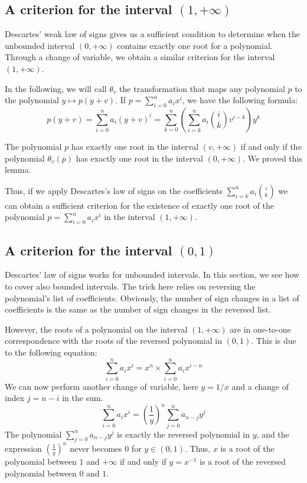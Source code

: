 \documentclass{mscs}
\begin{document}
\subsection{A criterion for the interval \((1,+\infty)\)}
Descartes' weak law of signs gives us a sufficient condition to
determine when the
unbounded interval \((0,+\infty)\) contains exactly one root for a
polynomial. Through a change of variable, we obtain a similar
criterion for the interval \((1, +\infty)\).

In the following, we will call \(\theta_v\) the transformation that
maps any polynomial \(p\) to the polynomial \(y \mapsto p(y+v)\).  If
\(p=\sum_{i=0}^n a_i x^i\), we have the following formula:
\[p(y+v)= \sum_{i=0}^{n} a_i (y+v)^i = \sum_{k=0}^{n}
(\sum_{i=k}^{n}a_i\binom{i}{k}v^{i-k}) y^k\]

The polynomial \(p\) has exactly one root in the interval \((v,+\infty)\)
if  and only if
the polynomial \(\theta_v(p)\) has exactly one root in the interval
\((0,+\infty)\).  %
We proved this lemma.

Thus, if we apply Descartes's law of signs on the coefficients
\(\sum_{i=k}^{n}a_i\binom{i}{k}\)
 we
can obtain a sufficient criterion for the existence of exactly one
root of the polynomial \(p=\sum_{i=0}^{n}a_ix^i\) in the interval
\((1,+\infty)\).
\subsection{A criterion for the interval \((0,1)\)}
Descartes' law of signs works for unbounded intervals.  In this
section, we see how to cover also bounded intervals. The trick here relies
on reversing the polynomial's list of coefficients.  Obviously, the
number of sign changes in a list of coefficients is the same as the
number of sign changes in the reversed list.

However, the roots of a polynomial on the interval \((1,+\infty)\)
are in one-to-one correspondence with the roots of the
reversed polynomial in \((0,1)\). This is due to the following
equation:
\[\sum_{i=0}^{n}a_i x^i = x^n\times\sum_{i=0}^{n}a_i x^{i-n}\]
We can now perform another change of variable, here \(y=1/x\) and a
change of index \(j=n-i\) in the sum.
\[\sum_{i=0}^{n}a_i x^i = (\frac{1}{y})^n \sum_{j=0}^{n}a_{n-j} y^j\]
The polynomial \(\sum_{j=0}^{n} a_{n-j}y^j\) is exactly the reversed
polynomial in \(y\), and the expression \((\frac{1}{y})^n\) never becomes 0 for
\(y\in (0,1)\).  Thus, \(x\) is a root of the polynomial between \(1\)
and \(+\infty\) if and only if \(y=x^{-1}\) is a root of the reversed
polynomial between \(0\) and \(1\).
\end{document}
